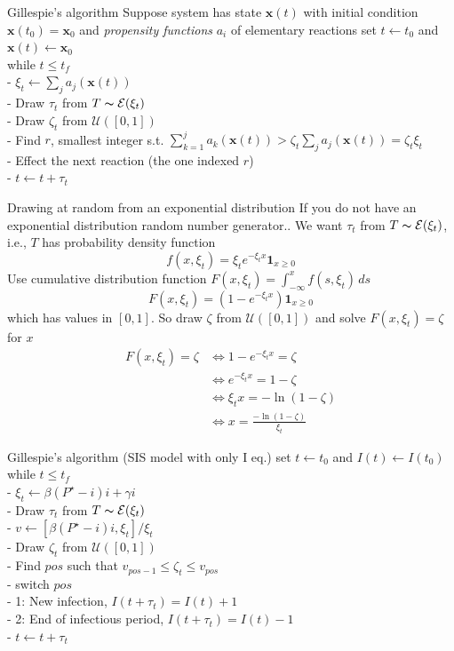 \documentclass[aspectratio=169]{beamer}\usepackage[]{graphicx}\usepackage[]{xcolor}
\begin{document}
\begin{frame}{Gillespie's algorithm}
Suppose system has state $\mathbf{x}(t)$ with initial condition $\mathbf{x}(t_0)=\mathbf{x}_0$ and \emph{propensity functions} $a_i$ of elementary reactions
\vfill
set $t\leftarrow t_0$ and $\mathbf{x}(t)\leftarrow \mathbf{x}_0$\\
while {$t\leq t_f$}\\
- $\xi_t\leftarrow \sum_j a_j(\mathbf{x}(t))$\\
- Draw $\tau_t$ from $T\thicksim \mathcal{E}(\xi_t)$\\
- Draw $\zeta_t$ from $\mathcal{U}([0,1])$\\
- Find $r$, smallest integer s.t. $\sum_{k=1}^j a_k(\mathbf{x}(t))> \zeta_t\sum_j a_j(\mathbf{x}(t))=\zeta_t\xi_t$\\
- Effect the next reaction (the one indexed $r$)\\
- $t\leftarrow t+\tau_t$\\    
\end{frame}


\begin{frame}{Drawing at random from an exponential distribution}
    If you do not have an exponential distribution random number generator.. We want $\tau_t$ from $T\thicksim\mathcal{E}(\xi_t)$, i.e., $T$ has probability density function
    $$
    f(x,\xi_t)=
    \xi_te^{-\xi_t x}\mathbf{1}_{x\geq 0}
    $$
    Use cumulative distribution function $F(x,\xi_t)=\int_{-\infty}^x f(s,\xi_t)\,ds$
    $$
    F(x,\xi_t)=
    (1-e^{-\xi_t x})\mathbf{1}_{x\geq 0}
    $$
    which has values in $[0,1]$. So draw $\zeta$ from $\mathcal{U}([0,1])$ and solve $F(x,\xi_t)=\zeta$ for $x$
    \begin{align*}
    F(x,\xi_t)=\zeta & \Leftrightarrow 1-e^{-\xi_tx}=\zeta \\
    &\Leftrightarrow e^{-\xi_tx} = 1-\zeta \\
    &\Leftrightarrow \xi_tx = -\ln(1-\zeta) \\
    &\Leftrightarrow \boxed{x = \frac{-\ln(1-\zeta)}{\xi_t}}
    \end{align*}
\end{frame}


\begin{frame}{Gillespie's algorithm (SIS model with only I eq.)}
set $t\leftarrow t_0$ and $I(t)\leftarrow I(t_0)$\\
while {$t\leq t_f$}\\
- $\xi_t\leftarrow \beta (P^\star-i)i+\gamma i$\\
- Draw $\tau_t$ from $T\thicksim \mathcal{E}(\xi_t)$\\
- $v\leftarrow\left[\beta (P^\star-i)i,\xi_t\right]/\xi_t$\\
- Draw $\zeta_t$ from $\mathcal{U}([0,1])$\\
- Find $pos$ such that $v_{pos-1}\leq\zeta_t\leq v_{pos}$\\
- switch {$pos$}\\
\qquad - 1: New infection, $I(t+\tau_t)=I(t)+1$ \\
\qquad - 2: End of infectious period, $I(t+\tau_t)=I(t)-1$ \\
- $t\leftarrow t+\tau_t$
\end{frame}
\end{document}
